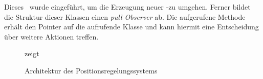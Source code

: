 
Dieses \Pack\ wurde eingeführt, um die Erzeugung neuer \ROS-\Msg[s] zu umgehen. Ferner bildet die Struktur dieser Klassen einen \textit{pull Observer} ab.
Die aufgerufene Methode erhält den Pointer auf die aufrufende Klasse und kann hiermit eine Entscheidung über weitere Aktionen treffen.




\begin{figure}[ht!]
\vspace{0.25cm}
\begin{center}
\caption{Architektur des Positionsregelungssystems}
\label{fig:Arch}
\end{center}

\vspace{0.25cm}
 zeigt \missing
\end{figure}


